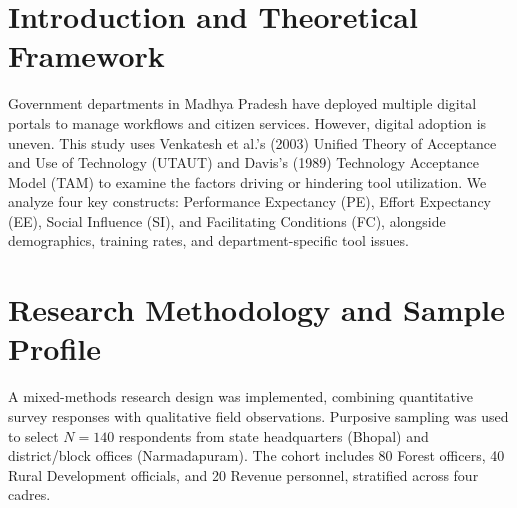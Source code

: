 \documentclass[10pt,a4paper]{article}
\begin{document}
\section{Introduction and Theoretical Framework}
Government departments in Madhya Pradesh have deployed multiple digital portals to manage workflows and citizen services. However, digital adoption is uneven. This study uses Venkatesh et al.'s (2003) Unified Theory of Acceptance and Use of Technology (UTAUT) and Davis's (1989) Technology Acceptance Model (TAM) to examine the factors driving or hindering tool utilization. We analyze four key constructs: Performance Expectancy (PE), Effort Expectancy (EE), Social Influence (SI), and Facilitating Conditions (FC), alongside demographics, training rates, and department-specific tool issues.

\section{Research Methodology and Sample Profile}
A mixed-methods research design was implemented, combining quantitative survey responses with qualitative field observations. Purposive sampling was used to select $N=140$ respondents from state headquarters (Bhopal) and district/block offices (Narmadapuram). The cohort includes 80 Forest officers, 40 Rural Development officials, and 20 Revenue personnel, stratified across four cadres.
\end{document}
